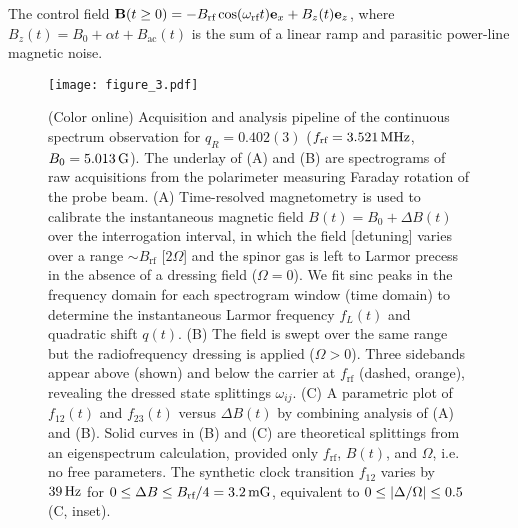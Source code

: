 \documentclass[aps,prl,reprint,superscriptaddress,floatfix]{revtex4-1}
\begin{document}
The control field $\mathbf{B}(t \geq 0) = -B_{\text{rf}} \cos (\omega_{\text{rf}} t) \mathbf{e}_x + B_z(t) \mathbf{e}_z$, where $B_z(t) = B_0 + \alpha t + B_{\text{ac}}(t)$ is the sum of a linear ramp and parasitic power-line magnetic noise.

\begin{figure}
    \centering
    \texttt{[image: figure\_3.pdf]}
    \caption{
    \label{fig:acquisition_pipeline}
        (Color online)
        Acquisition and analysis pipeline of the continuous spectrum observation for $q_R = 0.402(3)$ ($f_{\text{rf}}=\unit[3.521]{MHz}$, $B_0=\unit[5.013]{G}$).
        The underlay of (A) and (B) are spectrograms of raw acquisitions from the polarimeter measuring Faraday rotation of the probe beam.
        (A) Time-resolved magnetometry is used to calibrate the instantaneous magnetic field $B(t) = B_0 + \Delta B(t)$ over the interrogation interval, in which the field [detuning] varies over a range $\sim B_{\text{rf}}$ [$2\Omega$] and the spinor gas is left to Larmor precess in the absence of a dressing field ($\Omega = 0$).
        We fit sinc peaks in the frequency domain for each spectrogram window (time domain) to determine the instantaneous Larmor frequency $f_L(t)$ and quadratic shift $q(t)$.
       (B) The field is swept over the same range but the radiofrequency dressing is applied ($\Omega > 0$).
       Three sidebands appear above (shown) and below the carrier at $f_{\text{rf}}$ (dashed, orange), revealing the dressed state splittings $\omega_{ij}$.
       (C) A parametric plot of $f_{12}(t)$ and $f_{23}(t)$ versus $\Delta B(t)$ by combining analysis of (A) and (B).
       Solid curves in (B) and (C) are theoretical splittings from an eigenspectrum calculation, provided only $f_{\text{rf}}$, $B(t)$, and $\Omega$, i.e. no free parameters.
       The synthetic clock transition $f_{12}$ varies by $\unit[39]{Hz}$ for $0 \leq \Delta B \leq B_{\text{rf}}/4 = \unit[3.2]{mG}$, equivalent to $0 \leq \vert \Delta/\Omega \vert  \leq 0.5$ (C, inset).
    }
\end{figure}
\end{document}
